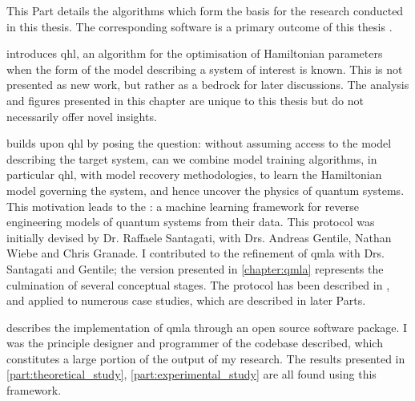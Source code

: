 \glsresetall
This Part details the algorithms which form the basis for the research conducted in this thesis. 
The corresponding software is a primary outcome of this thesis \cite{flynn2021QMLA, qmla_docs}.

\par 
\vspace{1cm}

 introduces \gls{qhl}, an algorithm for the optimisation of Hamiltonian parameters
    when the form of the model describing a system of interest is known. 
    This is not presented as new work, but rather as a bedrock for later discussions. 
    The analysis and figures presented in this chapter are unique to this thesis but do not necessarily offer novel insights. 
\par 
\vspace{1cm}
 builds upon \gls{qhl} by posing the question: 
    without assuming access to the model describing the target system, can we combine model training algorithms, 
    in particular \gls{qhl}, with model recovery methodologies, to learn the Hamiltonian model 
    governing the system, and hence uncover the physics of quantum systems. 
    This motivation leads to the : 
    a machine learning framework for reverse engineering models of quantum systems from their data.
    This protocol was initially devised by Dr. Raffaele Santagati, with Drs. Andreas Gentile, Nathan Wiebe and Chris Granade. 
    I contributed to the refinement of \gls{qmla} with Drs. Santagati and Gentile; 
    the version presented in \cref{chapter:qmla} represents the culmination of several conceptual stages. 
    The protocol has been described in \cite{gentile2020learning}, 
    and applied to numerous case studies, which are described in later Parts. 
\par
\vspace{1cm}

 describes the implementation of \gls{qmla} through an open source software package. 
I was the principle designer and programmer of the codebase described, which constitutes a large portion of the output of my research. 
The results presented in \cref{part:theoretical_study}, \cref{part:experimental_study} are all found using this framework. 
